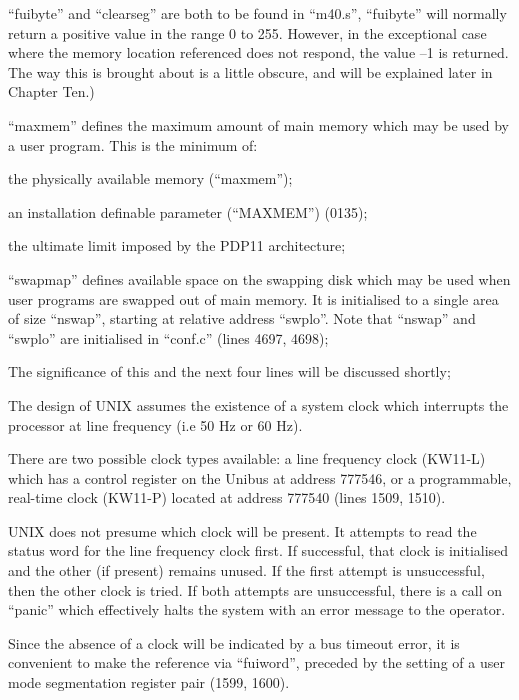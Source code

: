 ``fuibyte'' and ``clearseg'' are both to be
found in ``m40.s'', ``fuibyte'' will normally return a positive value in the
range 0 to 255. However, in the exceptional case where the memory location
referenced does not respond, the value
--1 is returned. The way this is
brought about is a little obscure, and
will be explained later in Chapter
Ten.)

\bd
\item[1582:] ``maxmem'' defines the maximum
 amount of main memory which may
 be used by a user program. This
 is the minimum of:

\bi
\item the physically available memory (``maxmem'');

\item an installation definable parameter (``MAXMEM'') (0135);

\item the ultimate limit imposed by the PDP11 architecture;
\ei

\item[1583:] ``swapmap'' defines available space
 on the swapping disk which may be
 used when user programs are
 swapped out of main memory. It is
 initialised to a single area of
 size ``nswap'', starting at relative address ``swplo''. Note that
 ``nswap'' and ``swplo'' are initialised in ``conf.c'' (lines 4697,
 4698);

\item[1589:] The significance of this and the
 next four lines will be discussed
 shortly;

\item[1599:] The design of UNIX assumes the
 existence of a system clock which
 interrupts the processor at line
 frequency (i.e 50 Hz or 60 Hz).

There are two possible clock
types available: a line frequency
clock (KW11-L) which has a control register on the Unibus at
address 777546, or a programmable, real-time clock (KW11-P)
located at address 777540 (lines
1509, 1510).

UNIX does not presume which clock
will be present. It attempts to
read the status word for the line
frequency clock first. If successful,
that clock is initialised and the other (if present)
remains unused. If the first
attempt is unsuccessful, then the
other clock is tried. If both
attempts are unsuccessful, there
is a call on ``panic'' which effectively halts the system with an
error message to the operator.
\ed

Since the absence of a clock will be
indicated by a bus timeout error, it is
convenient to make the reference via
``fuiword'', preceded by the setting of a
user mode segmentation register pair
(1599, 1600).


